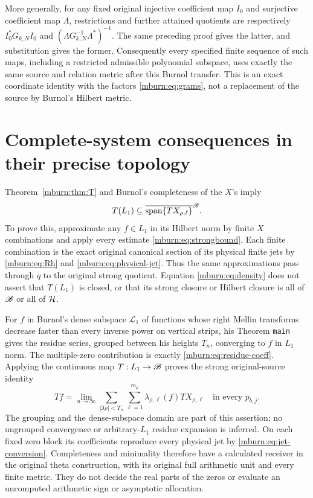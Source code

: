 \documentclass[11pt]{article}
\begin{document}
More generally, for any fixed original injective coefficient
map $I_0$ and surjective coefficient map $\Lambda$, restrictions
and further attained quotients are respectively
$I_0^*G_{k,N}I_0$ and
$(\Lambda G_{k,N}^{-1}\Lambda^*)^{-1}$.
The same preceding proof gives the latter, and substitution
gives the former. Consequently every specified finite
sequence of such maps, including a restricted admissible
polynomial subspace, uses exactly the same source and
relation metric after this Burnol transfer. This is an exact
coordinate identity with the factors \eqref{mburn:eq:grams}, not
a replacement of the source by Burnol's Hilbert metric.

\section{Complete-system consequences in their precise topology}

Theorem~\ref{mburn:thm:T} and Burnol's completeness of the $X$'s imply
\begin{equation}\label{mburn:eq:density}
 T(L_1)\subseteq
 \overline{\operatorname{span}\{T X_{\rho,\ell}\}}^{\mathscr B}.
\end{equation}
To prove this, approximate any $f\in L_1$ in its Hilbert
norm by finite $X$ combinations and apply every estimate
\eqref{mburn:eq:strongbound}. Each finite combination is the exact
original canonical section of its physical finite jets by
\eqref{mburn:eq:Rh} and \eqref{mburn:eq:physical-jet}. Thus the same
approximations pass through $q$ to the original strong quotient.
Equation \eqref{mburn:eq:density} does not assert that $T(L_1)$
is closed, or that its strong closure or Hilbert closure is
all of $\mathscr B$ or all of $\mathcal H$.

For $f$ in Burnol's dense subspace $\mathcal L_1$ of functions
whose right Mellin transforms decrease faster than every
inverse power on vertical strips, his Theorem \texttt{main}
gives the residue series, grouped between his heights $T_n$,
converging to $f$ in $L_1$ norm. The multiple-zero contribution
is exactly \eqref{mburn:eq:residue-coeff}. Applying the continuous
map $T:L_1\to\mathscr B$ proves the strong original-source identity
\begin{equation}\label{mburn:eq:strong-residue}
 Tf=\lim_{n\to\infty}
 \sum_{|\Im\rho|<T_n}\sum_{\ell=1}^{m_\rho}
                         \lambda_{\rho,\ell}(f)T X_{\rho,\ell}
                    \quad\text{in every }p_{b,j}.
\end{equation}
The grouping and the dense-subspace domain are part of this
assertion; no ungrouped convergence or arbitrary-$L_1$
residue expansion is inferred. On each fixed zero block its
coefficients reproduce every physical jet by
\eqref{mburn:eq:jet-conversion}. Completeness and minimality
therefore have a calculated receiver in the original
theta construction, with its original full arithmetic
unit and every finite metric. They do not decide the
real parts of the zeros or evaluate an uncomputed
arithmetic sign or asymptotic allocation.
\end{document}
